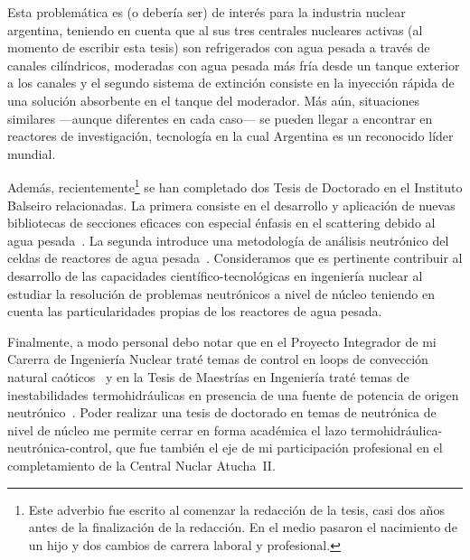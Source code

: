 % 

Esta problemática es (o debería ser) de interés para la industria nuclear argentina, teniendo en cuenta que al sus tres centrales nucleares activas (al momento de escribir esta tesis) son refrigerados con agua pesada a través de canales cilíndricos, moderadas con agua pesada más fría desde un tanque exterior a los canales y el segundo sistema de extinción consiste en la inyección rápida de una solución absorbente en el tanque del moderador. Más aún, situaciones similares ---aunque diferentes en cada caso--- se pueden llegar a encontrar en reactores de investigación, tecnología en la cual Argentina es un reconocido líder mundial.

\medskip

Además, recientemente\footnote{Este adverbio fue escrito al comenzar la redacción de la tesis, casi dos años antes de la finalización de la redacción. En el medio pasaron el nacimiento de un hijo y dos cambios de carrera laboral y profesional.} se han completado dos Tesis de Doctorado en el Instituto Balseiro relacionadas. La primera consiste en el desarrollo y aplicación de nuevas bibliotecas de secciones eficaces con especial énfasis en el scattering debido al agua pesada~\cite{nacho}. La segunda introduce una metodología de análisis neutrónico del celdas de reactores de agua pesada~\cite{chaco}. Consideramos que es pertinente contribuir al desarrollo de las capacidades científico-tecnológicas en ingeniería nuclear al estudiar la resolución de problemas neutrónicos a nivel de núcleo teniendo en cuenta las particularidades propias de los reactores de agua pesada.

Finalmente, a modo personal debo notar que en el Proyecto Integrador de mi Carerra de Ingeniería Nuclear traté temas de control en loops de convección natural caóticos~\cite{theler2007} y en la Tesis de Maestrías en Ingeniería traté temas de inestabilidades termohidráulicas en presencia de una fuente de potencia de origen neutrónico~\cite{theler2008}. Poder realizar una tesis de doctorado en temas de neutrónica de nivel de núcleo me permite cerrar en forma académica el lazo termohidráulica-neutrónica-control, que fue también el eje de mi participación profesional en el completamiento de la Central Nuclar Atucha~II.

